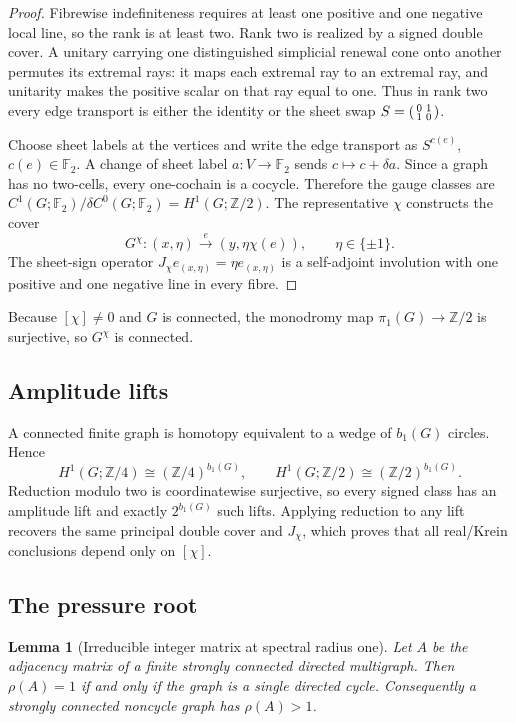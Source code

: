 \documentclass[11pt]{article}
\newtheorem{lemma}[theorem]{Lemma}
\theoremstyle{definition}
\theoremstyle{remark}
\newcommand{\F}{\mathbb F}
\newcommand{\Ztwo}{\mathbb Z/2}
\newcommand{\Zfour}{\mathbb Z/4}
\begin{document}
\begin{proof}
Fibrewise indefiniteness requires at least one positive and one negative local
line, so the rank is at least two.  Rank two is realized by a signed double
cover.  A unitary carrying one distinguished simplicial renewal cone onto
another permutes its extremal rays: it maps each extremal ray to an extremal
ray, and unitarity makes the positive scalar on that ray equal to one.  Thus in
rank two every edge transport is either the identity or the sheet swap
$S=\begin{psmallmatrix}0&1\\1&0\end{psmallmatrix}$.

Choose sheet labels at the vertices and write the edge transport as
$S^{c(e)}$, $c(e)\in\F_2$.  A change of sheet label $a:V\to\F_2$ sends
$c\mapsto c+\delta a$.  Since a graph has no two-cells, every one-cochain is a
cocycle.  Therefore the gauge classes are
$C^1(G;\F_2)/\delta C^0(G;\F_2)=H^1(G;\Ztwo)$.  The representative $\chi$
constructs the cover
\[
  G^\chi:
  (x,\eta)\xrightarrow{e}(y,\eta\chi(e)),
  \qquad \eta\in\{\pm1\}.
\]
The sheet-sign operator $J_\chi e_{(x,\eta)}=\eta e_{(x,\eta)}$ is a
self-adjoint involution with one positive and one negative line in every fibre.
\end{proof}

Because $[\chi]\ne0$ and $G$ is connected, the monodromy map
$\pi_1(G)\to\Ztwo$ is surjective, so $G^\chi$ is connected.

\subsection{Amplitude lifts}

A connected finite graph is homotopy equivalent to a wedge of
$b_1(G)$ circles.  Hence
\[
 H^1(G;\Zfour)\cong(\Zfour)^{b_1(G)},
 \qquad
 H^1(G;\Ztwo)\cong(\Ztwo)^{b_1(G)}.
\]
Reduction modulo two is coordinatewise surjective, so every signed class has an
amplitude lift and exactly $2^{b_1(G)}$ such lifts.  Applying reduction to any
lift recovers the same principal double cover and $J_\chi$, which proves that
all real/Krein conclusions depend only on $[\chi]$.

\subsection{The pressure root}

\begin{lemma}[Irreducible integer matrix at spectral radius one]
\label{lem:app-rho-one-cycle}
Let $A$ be the adjacency matrix of a finite strongly connected directed
multigraph.  Then $\rho(A)=1$ if and only if the graph is a single directed
cycle.  Consequently a strongly connected noncycle graph has $\rho(A)>1$.
\end{lemma}
\end{document}

